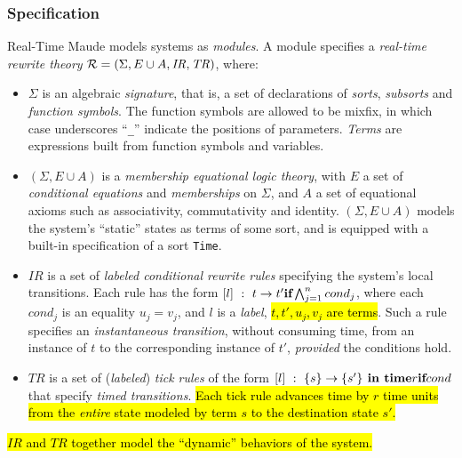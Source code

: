 \documentclass[10pt,journal]{IEEEtran}
\begin{document}
{\subsubsection{Specification}
Real-Time Maude models systems as \emph{modules}. A module specifies a
\emph{real-time rewrite theory} ${\cal R} = (\Sigma, E\cup A ,
\mathit{IR}, \mathit{TR})$, where:
\begin{itemize}
\item $\Sigma$ is an algebraic \emph{signature}, that is, a set of
  declarations of \emph{sorts}, \emph{subsorts} and \emph{function
    symbols}. The function symbols are allowed to be mixfix, in which
  case underscores ``\verb|_|'' indicate the positions of parameters.
  \emph{Terms} are expressions built from function symbols and
  variables.
\item $(\Sigma, E\cup A)$ is a \emph{membership equational logic
  theory}, with $E$ a set of \emph{conditional equations} and
  \emph{memberships} on $\Sigma$, and $A$ a set of equational axioms
  such as associativity, commutativity and identity.  $(\Sigma, E\cup
  A)$ models the system's ``static'' states as terms of some sort, and
  is equipped with a built-in specification of a sort \verb|Time|.
\item $\mathit{IR}$ is a set of \emph{labeled conditional rewrite
  rules} specifying the system's local transitions. Each rule has the
  form $[l]~:~t\rightarrow t'\mbox{ \textbf{if}
  }\bigwedge^n_{j=1}cond_j$, where each $cond_j$ is an equality
  $u_j=v_j$, and $l$ is a \emph{label}, \hl{$t,t',u_j,v_j$ are terms}. Such
  a rule specifies an \emph{instantaneous transition}, without
  consuming time, from an instance of $t$ to the corresponding
  instance of $t'$, \emph{provided} the conditions hold.
\item $\mathit{TR}$ is a set of (\emph{labeled}) \emph{tick rules} of
  the form $[l]~:~\{s\}\rightarrow\{s'\} \mbox{\textbf{ in time}
  }r\mbox{ \textbf{if} }cond$ that specify \emph{timed
    transitions}. \hl{Each tick rule advances time by $r$ time units from
  the \emph{entire} state modeled by term $s$ to the destination state
  $s'$.}
\end{itemize}

\hl{$\mathit{IR}$ and $\mathit{TR}$ together model the ``dynamic''
behaviors of the system.}

}
\end{document}
